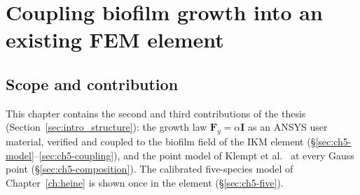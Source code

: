 %
%
%
\providecommand{\ansysfigdir}{../assets/}

\chapter{Coupling biofilm growth into an existing FEM element}
\label{ch:ansys}

\section{Scope and contribution}
\label{sec:ch5-scope}

This chapter contains the second and third contributions of the thesis (Section~\ref{sec:intro_structure}):
the growth law $\mathbf F_g=\alpha\mathbf I$ as an ANSYS user material, verified and coupled to the biofilm
field of the IKM element (\S\ref{sec:ch5-model}--\ref{sec:ch5-coupling}), and the point model of Klempt et
al.~\cite{Klempt2026ContinuumBacterialGrowth} at every Gauss point (\S\ref{sec:ch5-composition}). The
calibrated five-species model of Chapter~\ref{ch:heine} is shown once in the element (\S\ref{sec:ch5-five}).

